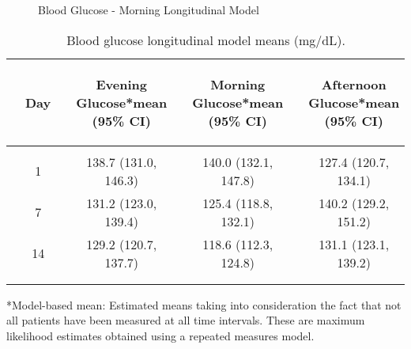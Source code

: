 \documentclass[dvips,10pt]{article}
\begin{document}
\begin{figure}
\caption{Blood Glucose - Morning Longitudinal Model}
\end{figure}
\clearpage
\begin{table}[t]
\caption
{ Blood glucose longitudinal model means (mg/dL). }
\begin{center}
\begin{tabular}{ @{}l@{}
@{}c@{}@{}p{1.5em}@{}@{}c@{}@{}p{1.5em}@{}@{}c@{}@{}p{1.5em}@{}@{}c@{}
}
\hline

& \parbox{6em}{\begin{center}Day\end{center}} && \parbox{6em}{\begin{center}Evening Glucose*mean (95\% CI)\end{center}} && \parbox{6em}{\begin{center}Morning Glucose*mean (95\% CI)\end{center}} && \parbox{6em}{\begin{center}Afternoon Glucose*mean (95\% CI)\end{center}} \\

\hline

\\
& 1 && 138.7 (131.0, 146.3) && 140.0 (132.1, 147.8) && 127.4 (120.7, 134.1) \\
& 7 && 131.2 (123.0, 139.4) && 125.4 (118.8, 132.1) && 140.2 (129.2, 151.2) \\
& 14 && 129.2 (120.7, 137.7) && 118.6 (112.3, 124.8) && 131.1 (123.1, 139.2) \\
\\
\hline \\

\end{tabular}


\parbox{ 5in }{ *Model-based mean:  Estimated means taking into consideration the fact that
       not all patients have been measured at all time intervals.  These are maximum likelihood
       estimates obtained using a repeated measures model. } \\
 \vspace{1em}\end{center}
 \end{table}
\end{document}
